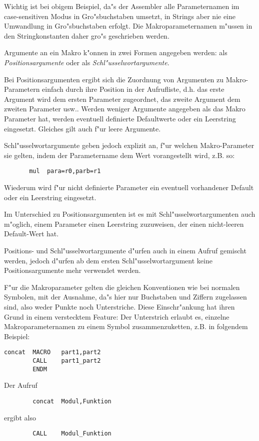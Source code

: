 \documentclass[12pt,a4paper,twoside]{report}
\begin{document}
Wichtig ist bei obigem Beispiel, da"s der Assembler alle
Parameternamen im case-sensitiven Modus in Gro"sbuchstaben
umsetzt, in Strings aber nie eine Umwandlung in Gro"sbuchstaben
erfolgt. Die Makroparameternamen m"ussen in den Stringkonstanten
daher gro"s geschrieben werden.
\par
Argumente an ein Makro k"onnen in zwei Formen angegeben werden:
als {\em Positionsargumente} oder als {\em
Schl"usselwortargumente}.
\par
Bei Positionsargumenten ergibt sich
die Zuordnung von Argumenten zu Makro-Parametern einfach durch
ihre Position in der Aufrufliste, d.h. das erste Argument wird dem
ersten Parameter zugeordnet, das zweite Argument dem zweiten
Parameter usw..  Werden weniger Argumente angegeben als das Makro
Parameter hat, werden eventuell definierte Defaultwerte oder ein
Leerstring eingesetzt.  Gleiches gilt auch f"ur leere Argumente.
\par
Schl"usselwortargumente geben jedoch explizit an, f"ur welchen
Makro-Parameter sie gelten, indem der Parametername dem Wert
vorangestellt wird, z.B. so:
\begin{verbatim}
       mul  para=r0,parb=r1
\end{verbatim}
Wiederum wird f"ur nicht definierte Parameter ein eventuell
vorhandener Default oder ein Leerstring eingesetzt.
\par
Im Unterschied zu Positionsargumenten ist es mit
Schl"usselwortargumenten auch m"oglich, einem Parameter einen
Leerstring zuzuweisen, der einen nicht-leeren Default-Wert hat.
\par
Positions- und Schl"usselwortargumente d"urfen auch in einem
Aufruf gemischt werden, jedoch d"urfen ab dem ersten
Schl"usselwortargument keine Positionsargumente mehr verwendet
werden.
\par
F"ur die Makroparameter gelten die gleichen Konventionen wie bei
normalen Symbolen, mit der Ausnahme, da"s hier nur Buchstaben
und Ziffern zugelassen sind, also weder Punkte noch
Unterstriche. Diese Einschr"ankung hat ihren Grund in einem
verstecktem Feature: Der Unterstrich erlaubt es, einzelne
Makroparameternamen zu einem Symbol zusammenzuketten, z.B. in
folgendem Beispiel:
\begin{verbatim}
concat  MACRO   part1,part2
        CALL    part1_part2
        ENDM
\end{verbatim}
Der Aufruf
\begin{verbatim}
        concat  Modul,Funktion
\end{verbatim}
ergibt also
\begin{verbatim}
        CALL    Modul_Funktion
\end{verbatim}
\end{document}
